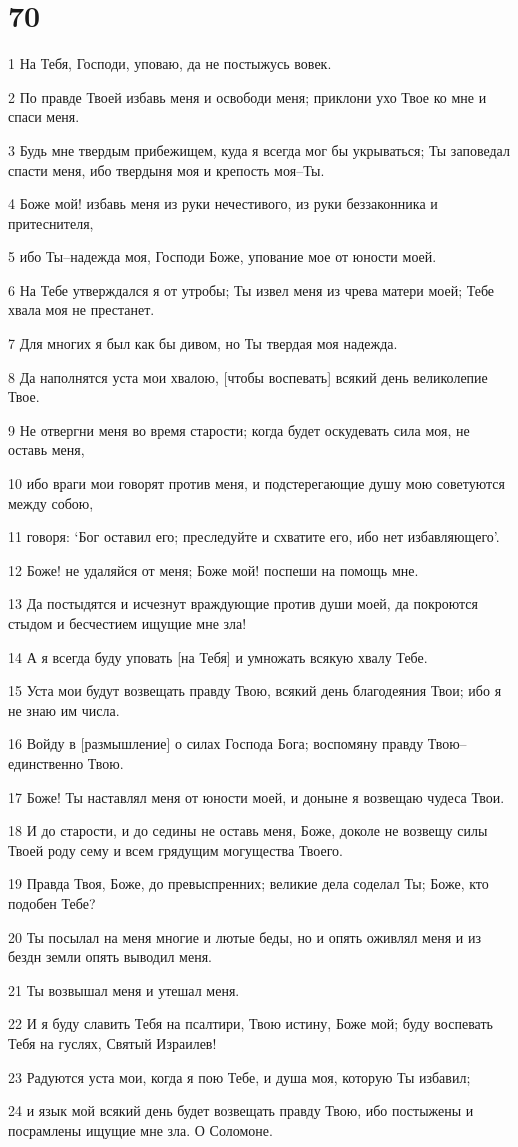 \chapter{70}

\par 1 На Тебя, Господи, уповаю, да не постыжусь вовек.
\par 2 По правде Твоей избавь меня и освободи меня; приклони ухо Твое ко мне и спаси меня.
\par 3 Будь мне твердым прибежищем, куда я всегда мог бы укрываться; Ты заповедал спасти меня, ибо твердыня моя и крепость моя--Ты.
\par 4 Боже мой! избавь меня из руки нечестивого, из руки беззаконника и притеснителя,
\par 5 ибо Ты--надежда моя, Господи Боже, упование мое от юности моей.
\par 6 На Тебе утверждался я от утробы; Ты извел меня из чрева матери моей; Тебе хвала моя не престанет.
\par 7 Для многих я был как бы дивом, но Ты твердая моя надежда.
\par 8 Да наполнятся уста мои хвалою, [чтобы воспевать] всякий день великолепие Твое.
\par 9 Не отвергни меня во время старости; когда будет оскудевать сила моя, не оставь меня,
\par 10 ибо враги мои говорят против меня, и подстерегающие душу мою советуются между собою,
\par 11 говоря: `Бог оставил его; преследуйте и схватите его, ибо нет избавляющего'.
\par 12 Боже! не удаляйся от меня; Боже мой! поспеши на помощь мне.
\par 13 Да постыдятся и исчезнут враждующие против души моей, да покроются стыдом и бесчестием ищущие мне зла!
\par 14 А я всегда буду уповать [на Тебя] и умножать всякую хвалу Тебе.
\par 15 Уста мои будут возвещать правду Твою, всякий день благодеяния Твои; ибо я не знаю им числа.
\par 16 Войду в [размышление] о силах Господа Бога; воспомяну правду Твою--единственно Твою.
\par 17 Боже! Ты наставлял меня от юности моей, и доныне я возвещаю чудеса Твои.
\par 18 И до старости, и до седины не оставь меня, Боже, доколе не возвещу силы Твоей роду сему и всем грядущим могущества Твоего.
\par 19 Правда Твоя, Боже, до превыспренних; великие дела соделал Ты; Боже, кто подобен Тебе?
\par 20 Ты посылал на меня многие и лютые беды, но и опять оживлял меня и из бездн земли опять выводил меня.
\par 21 Ты возвышал меня и утешал меня.
\par 22 И я буду славить Тебя на псалтири, Твою истину, Боже мой; буду воспевать Тебя на гуслях, Святый Израилев!
\par 23 Радуются уста мои, когда я пою Тебе, и душа моя, которую Ты избавил;
\par 24 и язык мой всякий день будет возвещать правду Твою, ибо постыжены и посрамлены ищущие мне зла. О Соломоне.

